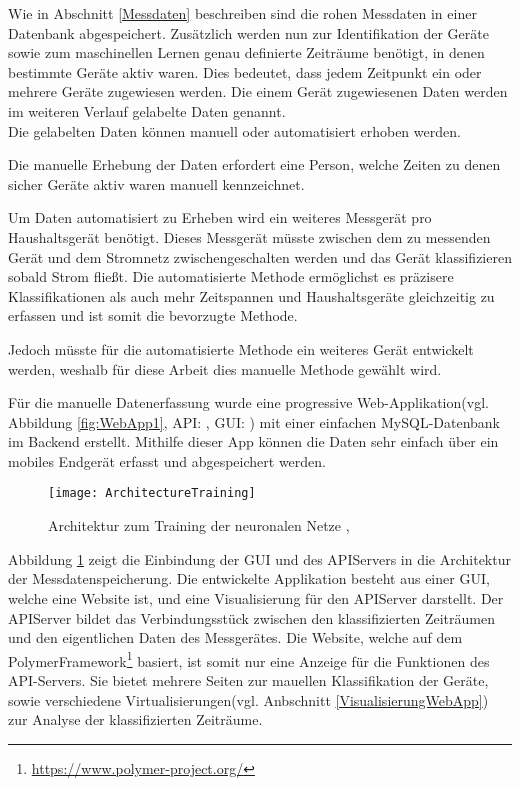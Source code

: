         Wie in Abschnitt \ref{Messdaten} beschreiben sind die rohen Messdaten in einer Datenbank abgespeichert.
        Zusätzlich werden nun zur Identifikation der Geräte sowie zum maschinellen Lernen genau definierte Zeiträume benötigt, in denen bestimmte Geräte aktiv waren.
        Dies bedeutet, dass jedem Zeitpunkt ein oder mehrere Geräte zugewiesen werden. 
        Die einem Gerät zugewiesenen Daten werden im weiteren Verlauf gelabelte Daten genannt.\\
        \newline
        Die gelabelten Daten können manuell oder automatisiert erhoben werden.

        Die manuelle Erhebung der Daten erfordert eine Person, welche Zeiten zu denen sicher Geräte aktiv waren manuell kennzeichnet.

        Um Daten automatisiert zu Erheben wird ein weiteres Messgerät pro Haushaltsgerät benötigt.
        Dieses Messgerät müsste zwischen dem zu messenden Gerät und dem Stromnetz zwischengeschalten werden und das Gerät klassifizieren sobald Strom fließt.
        Die automatisierte Methode ermöglichst es präzisere Klassifikationen als auch mehr Zeitspannen und Haushaltsgeräte gleichzeitig zu erfassen und ist somit die bevorzugte Methode.

        Jedoch müsste für die automatisierte Methode ein weiteres Gerät entwickelt werden, weshalb für diese Arbeit dies manuelle Methode gewählt wird.\\
        \newline

        Für die manuelle Datenerfassung wurde eine progressive Web-Applikation(vgl. Abbildung \ref{fig:WebApp1}, API: \cite{WesenseAPIRepo}, GUI: \cite{WesenseGUIRepo}) mit einer einfachen MySQL-Datenbank im Backend erstellt.
        Mithilfe dieser App können die Daten sehr einfach über ein mobiles Endgerät erfasst und abgespeichert werden.
        \newline

        \begin{figure}[h]
            \centering
            \texttt{[image: ArchitectureTraining]}
            \caption{Architektur zum Training der neuronalen Netze \protect\cite{DrawIO}, \protect\cite{Tensorflow}}
            \label{fig:ArchitectureTraining}
        \end{figure}

        Abbildung \ref{fig:ArchitectureTraining} zeigt die Einbindung der GUI und des API\-Servers in die Architektur der Messdatenspeicherung.
        Die entwickelte Applikation besteht aus einer GUI, welche eine Website ist, und eine Visualisierung für den API\-Server darstellt.
        Der API\-Server bildet das Verbindungsstück zwischen den klassifizierten Zeiträumen und den eigentlichen Daten des Messgerätes.
        Die Website, welche auf dem Polymer\-Framework\footnote{\url{https://www.polymer-project.org/}} basiert, ist somit nur eine Anzeige für die Funktionen des API-Servers.
        Sie bietet mehrere Seiten zur mauellen Klassifikation der Geräte, sowie verschiedene Virtualisierungen(vgl. Anbschnitt \ref{VisualisierungWebApp}) zur Analyse der klassifizierten Zeiträume.

